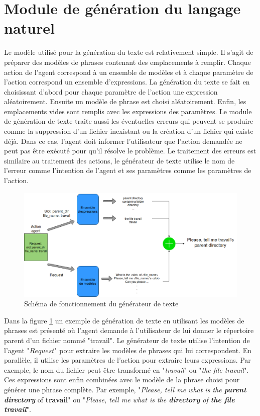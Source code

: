 \section{Module de génération du langage naturel}
Le modèle utilisé pour la génération du texte est relativement simple. Il s'agit de préparer des modèles de phrases contenant des emplacements à remplir. Chaque action de l'agent correspond à un ensemble de modèles et à chaque paramètre de l'action correspond un ensemble d'expressions. La génération du texte se fait en choisissant d'abord pour chaque paramètre de l'action une expression aléatoirement. Ensuite un modèle de phrase est choisi aléatoirement. Enfin, les emplacements vides sont remplis avec les expressions des paramètres. Le module de génération de texte traite aussi les éventuelles erreurs qui peuvent se produire comme la suppression d'un fichier inexistant ou la création d'un fichier qui existe déjà. Dans ce cas, l'agent doit informer l'utilisateur que l'action demandée ne peut pas être exécuté pour qu'il résolve le problème. Le traitement des erreurs est similaire au traitement des actions, le générateur de texte utilise le nom de l'erreur comme l'intention de l'agent et ses paramètres comme les paramètres de l'action.
\begin{figure}[H] 
	\centering
	\includegraphics[width=0.95\linewidth]{images/Conception/NLG.png}
	\caption{Schéma de fonctionnement du générateur de texte}\label{nlg_schema}
\end{figure}
Dans la figure \ref{nlg_schema} un exemple de génération de texte en utilisant les modèles de phrases est présenté où l'agent demande à l'utilisateur de lui donner le répertoire parent d'un fichier nommé "travail". Le générateur de texte utilise l'intention de l'agent "$Request$" pour extraire les modèles de phrases qui lui correspondent. En parallèle, il utilise les paramètres de l'action pour extraire leurs expressions. Par exemple, le nom du fichier peut être transformé en "\textit{travail}" ou "\textit{the file travail}". Ces expressions sont enfin combinées avec le modèle de la phrase choisi pour générer une phrase complète. Par exemple, "\textit{Please, tell me what is the \textbf{parent directory}} of \textbf{travail}" ou "\textit{Please, tell me what is the \textbf{directory} of \textbf{the file travail}}".
